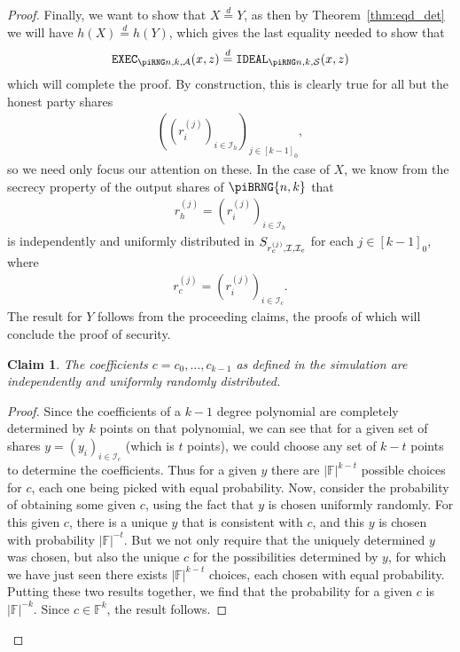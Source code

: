 \documentclass{article}
\newcommand{\eqd}[0]{\stackrel{d}{=}}
\newcommand{\seqZ}[1]{\left[#1\right]_0}
\newtheorem{claim}{Claim}
\theoremstyle{remark}
\newcommand{\F}{\mathbb{F}}
\begin{document}
\begin{proof}
	Finally, we want to show that $X \eqd Y$, as then by
	Theorem~\ref{thm:eqd_det} we will have $h(X) \eqd h(Y)$, which gives the
	last equality needed to show that
	\begin{align*}
		\execD \eqd \idealD
	\end{align*}
	which will complete the proof. By construction, this is clearly true for
	all but the honest party shares
	\begin{align*}
		{\left(
			{\left(r_i^{(j)}\right)}_{i \in \mathcal{I}_h}
		\right)}_{j \in \seqZ{k-1}},
	\end{align*}
	so we need only focus our attention on these. In the case of $X$, we know
	from the secrecy property of the output shares of $\piBRNG{n,k}$ that
	\begin{align*}
		r_h^{(j)}
		=
		{\left(r_i^{(j)}\right)}_{i \in \mathcal{I}_h}
	\end{align*}
	is independently and uniformly distributed in
	$S_{r_c^{(j)}, \mathcal{I}, \mathcal{I}_c}$ for each $j \in
	\seqZ{k-1}$, where
	\begin{align*}
		r_c^{(j)} = {\left(r_i^{(j)}\right)}_{i \in \mathcal{I}_c}.
	\end{align*}
	The result for $Y$ follows from the proceeding claims, the proofs of which
	will conclude the proof of security.

	\begin{claim}
		The coefficients $c = c_0, \ldots, c_{k-1}$ as defined in the
		simulation are independently and uniformly randomly distributed.
	\end{claim}

	\begin{proof}
		Since the coefficients of a $k-1$ degree polynomial are completely
		determined by $k$ points on that polynomial, we can see that for a
		given set of shares $y = {(y_i)}_{i \in \mathcal{I}_c}$ (which is $t$
		points), we could choose any set of $k-t$ points to determine the
		coefficients. Thus for a given $y$ there are $|\F|^{k-t}$ possible
		choices for $c$, each one being picked with equal probability. Now,
		consider the probability of obtaining some given $c$, using the fact
		that $y$ is chosen uniformly randomly. For this given $c$, there is a
		unique $y$ that is consistent with $c$, and this $y$ is chosen with
		probability $|\F|^{-t}$. But we not only require that the uniquely
		determined $y$ was chosen, but also the unique $c$ for the
		possibilities determined by $y$, for which we have just seen there
		exists $|\F|^{k-t}$ choices, each chosen with equal probability.
		Putting these two results together, we find that the probability for a
		given $c$ is $|\F|^{-k}$. Since $c \in \F^k$, the result follows.
	\end{proof}


\end{proof}
\end{document}
